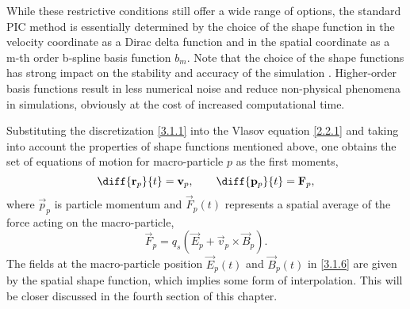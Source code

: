 While these restrictive conditions still offer a wide range of options, the standard PIC method is essentially determined by the choice of the shape function in the velocity coordinate as a Dirac delta function and in the spatial coordinate as a m-th order b-spline basis function $ b_{m} $.
Note that the choice of the shape functions has strong impact on the stability and accuracy of the simulation \cite{birdsall}. Higher-order basis functions result in less numerical noise and reduce non-physical phenomena in simulations, obviously at the cost of increased computational time.

Substituting the discretization \ref{3.1.1} into the Vlasov equation \ref{2.2.1} and taking into account the properties of shape functions mentioned above, one obtains the set of equations of motion for macro-particle $ p $ as the first moments,
\begin{equation}
\label{3.1.5}
\diff{\vec{r}_{p}}{t} = \vec{v}_{p}, \qquad \diff{\vec{p}_{p}}{t} = \vec{F}_{p},
\end{equation}
where $ \vec{p}_{p} $ is particle momentum and $ \vec{F}_p \left( t\right) $ represents a spatial average of the force acting on the macro-particle,
\begin{equation}
\label{3.1.6}
\vec{F}_p = q_s \left(\vec{E}_p + \vec{v}_p \times \vec{B}_p \right).
\end{equation}
The fields at the macro-particle position $ \vec{E}_p \left( t\right) $ and $ \vec{B}_p \left( t\right) $ in \ref{3.1.6} are given by the spatial shape function, which implies some form of interpolation. This will be closer discussed in the fourth section of this chapter.

